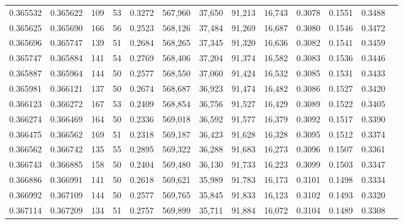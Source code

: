 \begin{tabular}{rrrrrrrrrrrrr}
0.365532 & 0.365622 &   109 &  53 &                                     0.3272 & 567,960 &  37,650 &  91,213 &  16,743 & 0.3078 & 0.1551 & 0.3488 \\
0.365625 & 0.365690 &   166 &  56 &                                     0.2523 & 568,126 &  37,484 &  91,269 &  16,687 & 0.3080 & 0.1546 & 0.3472 \\
0.365696 & 0.365747 &   139 &  51 &                                     0.2684 & 568,265 &  37,345 &  91,320 &  16,636 & 0.3082 & 0.1541 & 0.3459 \\
0.365747 & 0.365884 &   141 &  54 &                                     0.2769 & 568,406 &  37,204 &  91,374 &  16,582 & 0.3083 & 0.1536 & 0.3446 \\
0.365887 & 0.365964 &   144 &  50 &                                     0.2577 & 568,550 &  37,060 &  91,424 &  16,532 & 0.3085 & 0.1531 & 0.3433 \\
0.365981 & 0.366121 &   137 &  50 &                                     0.2674 & 568,687 &  36,923 &  91,474 &  16,482 & 0.3086 & 0.1527 & 0.3420 \\
0.366123 & 0.366272 &   167 &  53 &                                     0.2409 & 568,854 &  36,756 &  91,527 &  16,429 & 0.3089 & 0.1522 & 0.3405 \\
0.366274 & 0.366469 &   164 &  50 &                                     0.2336 & 569,018 &  36,592 &  91,577 &  16,379 & 0.3092 & 0.1517 & 0.3390 \\
0.366475 & 0.366562 &   169 &  51 &                                     0.2318 & 569,187 &  36,423 &  91,628 &  16,328 & 0.3095 & 0.1512 & 0.3374 \\
0.366562 & 0.366742 &   135 &  55 &                                     0.2895 & 569,322 &  36,288 &  91,683 &  16,273 & 0.3096 & 0.1507 & 0.3361 \\
0.366743 & 0.366885 &   158 &  50 &                                     0.2404 & 569,480 &  36,130 &  91,733 &  16,223 & 0.3099 & 0.1503 & 0.3347 \\
0.366886 & 0.366991 &   141 &  50 &                                     0.2618 & 569,621 &  35,989 &  91,783 &  16,173 & 0.3101 & 0.1498 & 0.3334 \\
0.366992 & 0.367109 &   144 &  50 &                                     0.2577 & 569,765 &  35,845 &  91,833 &  16,123 & 0.3102 & 0.1493 & 0.3320 \\
0.367114 & 0.367209 &   134 &  51 &                                     0.2757 & 569,899 &  35,711 &  91,884 &  16,072 & 0.3104 & 0.1489 & 0.3308 \\

\end{tabular}
